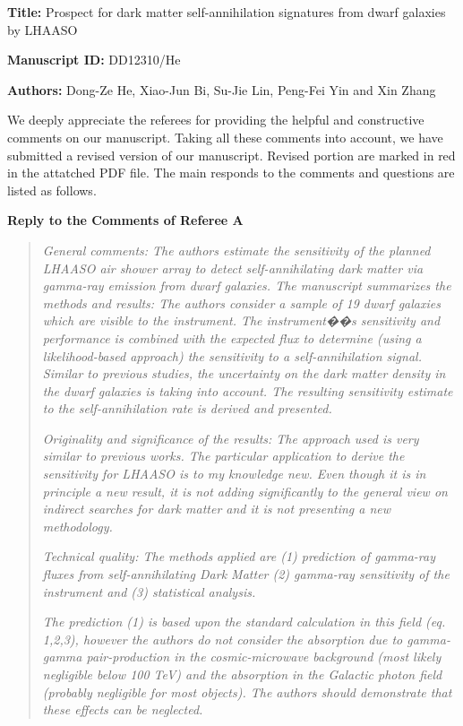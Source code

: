 \documentclass{article}
\begin{document}
\begin{flushleft}
\textbf{Title:} Prospect for dark matter self-annihilation signatures from dwarf galaxies by LHAASO

\textbf{Manuscript ID:} DD12310/He

\textbf{Authors:} Dong-Ze He, Xiao-Jun Bi, Su-Jie Lin, Peng-Fei Yin and Xin Zhang
\end{flushleft}


We deeply appreciate the referees for providing the helpful and constructive comments on our manuscript.
Taking all these comments into account, we have submitted a revised version of our manuscript. Revised portion are marked in red in the attatched PDF file. The main responds to the comments and questions are listed as follows.
\vskip 1.5cm

\begin{center}
\textbf{\large Reply to the Comments of Referee A}
\end{center}

\vspace{3mm}

\begin{quote}
\emph{General comments: The authors estimate the sensitivity of the planned LHAASO air shower array to detect self-annihilating dark matter via gamma-ray emission from dwarf galaxies. The manuscript summarizes the methods and results: The authors consider a sample of 19 dwarf galaxies which are visible to the instrument. The instrument��s sensitivity and performance is combined with the expected flux to determine (using a likelihood-based approach) the sensitivity to a self-annihilation signal. Similar to previous studies, the uncertainty on the dark matter density in the dwarf galaxies is taking into account. The resulting sensitivity estimate to the self-annihilation rate is derived and presented.}

\emph{Originality and significance of the results: The approach used is very similar to previous works. The particular application to derive the sensitivity for LHAASO is to my knowledge new. Even though it is in principle a new result, it is not adding significantly to the general view on indirect searches for dark matter and it is not presenting a new methodology.}

\emph{Technical quality: The methods applied are (1) prediction of gamma-ray fluxes from self-annihilating Dark Matter (2) gamma-ray sensitivity of the instrument and (3) statistical analysis.}

\emph{The prediction (1) is based upon the standard calculation in this field (eq. 1,2,3), however the authors do not consider the absorption due to gamma-gamma pair-production in the cosmic-microwave background (most likely negligible below 100 TeV) and the absorption in the Galactic
photon field (probably negligible for most objects). The authors should demonstrate that these effects can be neglected.}
\end{quote}
\end{document}
